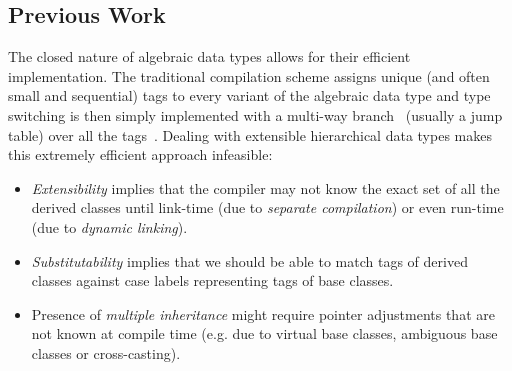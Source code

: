 
\subsection{Previous Work}
\label{sec:prev}

The closed nature of algebraic data types allows for their efficient 
implementation. The traditional compilation scheme assigns unique (and often 
small and sequential) tags to every variant of the algebraic data type and type 
switching is then simply implemented with a multi-way branch~\cite{Spuler94} 
(usually a jump table) over all the tags~\cite{Augustsson85}. Dealing with 
extensible hierarchical data types makes this extremely efficient approach 
infeasible:

\begin{itemize}
\setlength{\itemsep}{0pt}
\setlength{\parskip}{0pt}
\item \emph{Extensibility} implies that the compiler may not know the exact set 
      of all the derived classes until link-time (due to \emph{separate compilation}) 
      or even run-time (due to \emph{dynamic linking}).
\item \emph{Substitutability} implies that we should be able to 
      match tags of derived classes against case labels representing tags of 
      base classes.
\item Presence of \emph{multiple inheritance} might require pointer adjustments 
      that are not known at compile time (e.g. due to virtual base classes, 
      ambiguous base classes or cross-casting).
\end{itemize}

%

